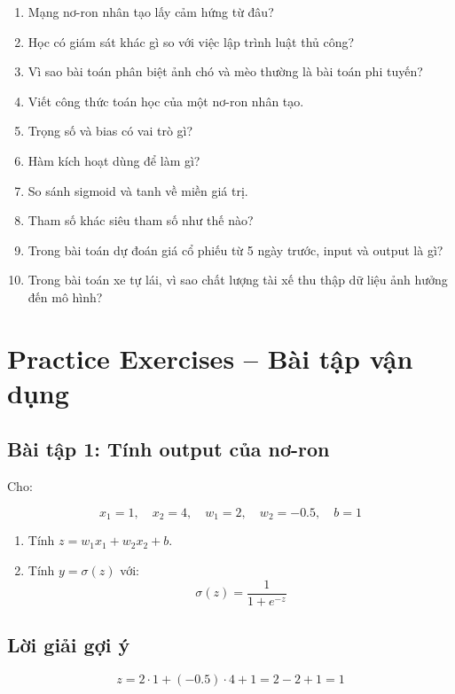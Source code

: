 \begin{enumerate}
    \item Mạng nơ-ron nhân tạo lấy cảm hứng từ đâu?
    \item Học có giám sát khác gì so với việc lập trình luật thủ công?
    \item Vì sao bài toán phân biệt ảnh chó và mèo thường là bài toán phi tuyến?
    \item Viết công thức toán học của một nơ-ron nhân tạo.
    \item Trọng số và bias có vai trò gì?
    \item Hàm kích hoạt dùng để làm gì?
    \item So sánh sigmoid và tanh về miền giá trị.
    \item Tham số khác siêu tham số như thế nào?
    \item Trong bài toán dự đoán giá cổ phiếu từ 5 ngày trước, input và output là gì?
    \item Trong bài toán xe tự lái, vì sao chất lượng tài xế thu thập dữ liệu ảnh hưởng đến mô hình?
\end{enumerate}

\section{Practice Exercises -- Bài tập vận dụng}

\subsection*{Bài tập 1: Tính output của nơ-ron}

Cho:

\[
    x_1=1,\quad x_2=4,\quad w_1=2,\quad w_2=-0.5,\quad b=1
\]

\begin{enumerate}
    \item Tính $z=w_1x_1+w_2x_2+b$.
    \item Tính $y=\sigma(z)$ với:
    \[
        \sigma(z)=\frac{1}{1+e^{-z}}
    \]
\end{enumerate}

\subsection*{Lời giải gợi ý}

\[
    z = 2\cdot 1 + (-0.5)\cdot 4 + 1 = 2 - 2 + 1 = 1
\]

